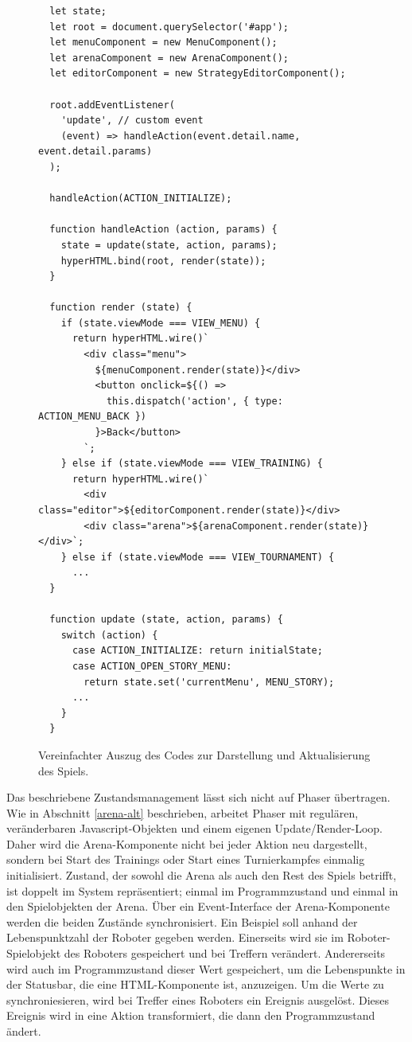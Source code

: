 \begin{figure}
  \begin{lstlisting}
  let state;
  let root = document.querySelector('#app');
  let menuComponent = new MenuComponent();
  let arenaComponent = new ArenaComponent();
  let editorComponent = new StrategyEditorComponent();

  root.addEventListener(
    'update', // custom event
    (event) => handleAction(event.detail.name, event.detail.params)
  );

  handleAction(ACTION_INITIALIZE);

  function handleAction (action, params) {
    state = update(state, action, params);
    hyperHTML.bind(root, render(state));
  }

  function render (state) {
    if (state.viewMode === VIEW_MENU) {
      return hyperHTML.wire()`
        <div class="menu">
          ${menuComponent.render(state)}</div>
          <button onclick=${() => 
            this.dispatch('action', { type: ACTION_MENU_BACK })
          }>Back</button>
        `;
    } else if (state.viewMode === VIEW_TRAINING) {
      return hyperHTML.wire()`
        <div class="editor">${editorComponent.render(state)}</div>
        <div class="arena">${arenaComponent.render(state)}</div>`;
    } else if (state.viewMode === VIEW_TOURNAMENT) {
      ...
  }

  function update (state, action, params) {
    switch (action) {
      case ACTION_INITIALIZE: return initialState;
      case ACTION_OPEN_STORY_MENU:
        return state.set('currentMenu', MENU_STORY);
      ...
    }
  }
  \end{lstlisting}

  \caption{Vereinfachter Auszug des Codes zur Darstellung und Aktualisierung des Spiels.}

  \label{update-loop}
\end{figure}

Das beschriebene Zustandsmanagement lässt sich nicht auf Phaser übertragen. Wie in Abschnitt
\ref{arena-alt} beschrieben, arbeitet Phaser mit regulären, veränderbaren Javascript-Objekten und
einem eigenen Update/Render-Loop. Daher wird die Arena-Komponente nicht bei jeder Aktion neu
dargestellt, sondern bei Start des Trainings oder Start eines Turnierkampfes einmalig initialisiert.
Zustand, der sowohl die Arena als auch den Rest des Spiels betrifft, ist doppelt im System
repräsentiert; einmal im Programmzustand und einmal in den Spielobjekten der Arena. Über ein
Event-Interface der Arena-Komponente werden die beiden Zustände synchronisiert. Ein Beispiel soll
anhand der Lebenspunktzahl der Roboter gegeben werden. Einerseits wird sie im Roboter-Spielobjekt
des Roboters gespeichert und bei Treffern verändert. Andererseits wird auch im Programmzustand
dieser Wert gespeichert, um die Lebenspunkte in der Statusbar, die eine HTML-Komponente ist,
anzuzeigen. Um die Werte zu synchroniesieren, wird bei Treffer eines Roboters ein Ereignis
ausgelöst. Dieses Ereignis wird in eine Aktion transformiert, die dann den Programmzustand ändert.


